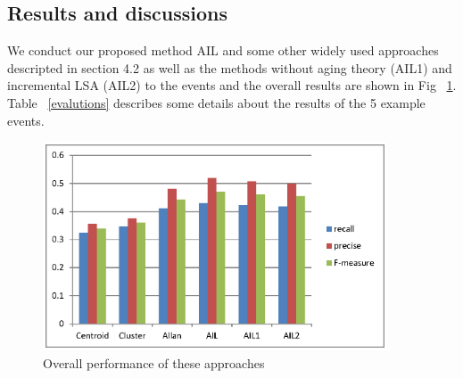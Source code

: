 \documentclass[runningheads,a4paper]{llncs}
\begin{document}
\subsection{Results and discussions}
We conduct our proposed method AIL and some other widely used approaches descripted in section 4.2 as well as the methods without aging theory (AIL1) and incremental LSA (AIL2) to the events and the overall results are shown in Fig ~\ref{fig:zhuzhuangtu}. Table ~\ref{evalutions} describes some details about the results of the 5 example events.
\begin{figure}
\centering
\includegraphics[height=6.2cm]{zhuzhuangtu}
\caption{Overall performance of these approaches}
\label{fig:zhuzhuangtu}
\end{figure}
\end{document}
